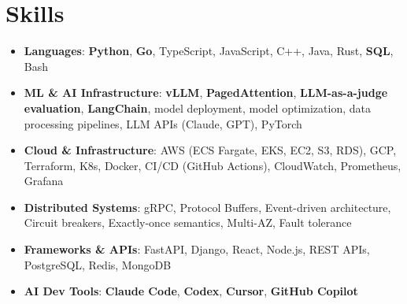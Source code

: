 \documentclass[letterpaper,11pt]{article}
\newcommand{\resumeSubHeadingListStart}{\begin{itemize}[leftmargin=0.15in, label={}]}
\newcommand{\resumeSubHeadingListEnd}{\end{itemize}}
\newcommand{\resumeSkillHeading}[2]{%
  \item\small{\textbf{#1}: #2 \vspace{-9pt}}%
}
\begin{document}
\section{Skills}
  \resumeSubHeadingListStart
    \resumeSkillHeading{Languages}{\textbf{Python}, \textbf{Go}, TypeScript, JavaScript, C++, Java, Rust, \textbf{SQL}, Bash}
    \resumeSkillHeading{ML \& AI Infrastructure}{\textbf{vLLM}, \textbf{PagedAttention}, \textbf{LLM-as-a-judge evaluation}, \textbf{LangChain}, model deployment, model optimization, data processing pipelines, LLM APIs (Claude, GPT), PyTorch}
    \resumeSkillHeading{Cloud \& Infrastructure}{AWS (ECS Fargate, EKS, EC2, S3, RDS), GCP, Terraform, K8s, Docker, CI/CD (GitHub Actions), CloudWatch, Prometheus, Grafana}
    \resumeSkillHeading{Distributed Systems}{gRPC, Protocol Buffers, Event-driven architecture, Circuit breakers, Exactly-once semantics, Multi-AZ, Fault tolerance}
    \resumeSkillHeading{Frameworks \& APIs}{FastAPI, Django, React, Node.js, REST APIs, PostgreSQL, Redis, MongoDB}
    \resumeSkillHeading{AI Dev Tools}{\textbf{Claude Code}, \textbf{Codex}, \textbf{Cursor}, \textbf{GitHub Copilot}}
  \resumeSubHeadingListEnd
\end{document}
